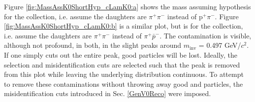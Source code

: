 \documentclass[/home/jesse/Analysis/FemtoAnalysis/AnalysisNotes/AnalysisNoteJBuxton.tex]{subfiles}
\begin{document}
Figure \ref{fig:MassAssK0ShortHyp_cLamK0:a} shows the mass assuming \Ks hypothesis for the \Lam collection, i.e. assume the daughters are $\pi^{+}\pi^{-}$ instead of p$^{+}\pi^{-}$.
Figure \ref{fig:MassAssK0ShortHyp_cLamK0:b} is a similar plot, but is for the \ALam collection, i.e. assume the daughters are $\pi^{+}\pi^{-}$ instead of $\pi^{+}\bar{p}^{-}$.
The \Ks contamination is visible, although not profound, in both, in the slight peaks around $m_{\mathrm{inv}}$ = 0.497 GeV/$c^{2}$.
If one simply cuts out the entire peak, good \Lam particles will be lost.
Ideally, the \Lam selection and \Ks misidentification cuts are selected such that the peak is removed from this plot while leaving the underlying distribution continuous.
To attempt to remove these \Ks contaminations without throwing away good \Lam and \ALam particles, the misidentification cuts introduced in Sec. \ref{GenV0Reco} were imposed.
\end{document}

